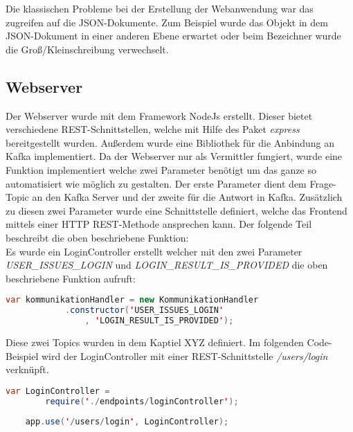 
Die klassischen Probleme bei der Erstellung der Webanwendung war das zugreifen auf die JSON-Dokumente. Zum Beispiel wurde das Objekt in dem JSON-Dokument in einer anderen Ebene erwartet oder beim Bezeichner wurde die Groß/Kleinschreibung verwechselt.


\subsection{Webserver}
Der Webserver wurde mit dem Framework NodeJs erstellt. Dieser bietet verschiedene REST-Schnittstellen, welche mit Hilfe des Paket \textit{express} bereitgestellt wurden. Außerdem wurde eine Bibliothek für die Anbindung an Kafka implementiert. Da der Webserver nur als Vermittler fungiert, wurde eine Funktion implementiert welche zwei Parameter benötigt um das ganze so automatisiert wie möglich zu gestalten. Der erste Parameter dient dem Frage-Topic an den Kafka Server und der zweite für die Antwort in Kafka. Zusätzlich zu diesen zwei Parameter wurde eine Schnittstelle definiert, welche das Frontend mittels einer  HTTP REST-Methode ansprechen kann. Der folgende Teil beschreibt die oben beschriebene Funktion: \\

Es wurde ein LoginController erstellt welcher mit den zwei Parameter \textit{USER\_ISSUES\_LOGIN} und \textit{LOGIN\_RESULT\_IS\_PROVIDED} die oben beschriebene Funktion aufruft: \\

\begin{lstlisting}[language=Java] 
	var kommunikationHandler = new KommunikationHandler
			.constructor('USER_ISSUES_LOGIN'
				, 'LOGIN_RESULT_IS_PROVIDED');
\end{lstlisting} 

Diese zwei Topics wurden in dem Kaptiel XYZ definiert. Im folgenden Code-Beispiel wird der LoginController mit einer REST-Schnittstelle \textit{/users/login} verknüpft. \\

\begin{lstlisting}[language=Java] 
	var LoginController = 
		require('./endpoints/loginController');
		
	app.use('/users/login', LoginController);
\end{lstlisting}

